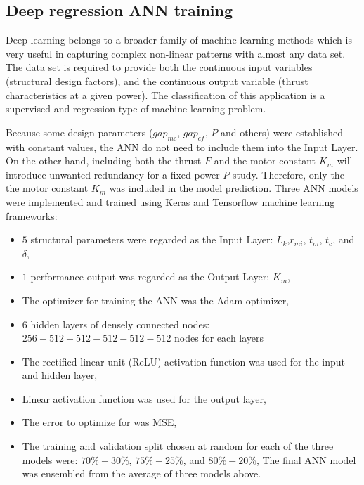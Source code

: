         
        \subsection{Deep regression ANN training}   \label{Chapter:RSM/PMLSM/ANN training}
        
            
            Deep learning belongs to a broader family of machine learning methods which is very useful in capturing complex non-linear patterns with almost any data set. The data set is required to provide both the continuous input variables (structural design factors), and the continuous output variable (thrust characteristics at a given power). The classification of this application is a supervised and regression type of machine learning problem.
            
            
            Because some design parameters ($gap_{mc}$, $gap_{cf}$, $P$ and others) were established with constant values, the \acs{ANN} do not need to include them into the Input Layer. On the other hand, including both the thrust $F$ and the motor constant $K_m$ will introduce unwanted redundancy for a fixed power $P$ study. Therefore, only the the motor constant $K_m$ was included in the model prediction. Three \acs{ANN} models were implemented and trained using Keras and Tensorflow machine learning frameworks:
            
            
            \begin{itemize}
                \item $5$ structural parameters were regarded as the Input Layer: $L_k$,$r_{mi}$, $t_m$, $t_c$, and $\delta$,
                \item $1$ performance output was regarded as the Output Layer: $K_m$,
                \item The optimizer for training the \acs{ANN} was the Adam optimizer,
                \item $6$ hidden layers of densely connected nodes: $256-512-512-512-512-512$ nodes for each layers
                \item The rectified linear unit (ReLU) activation function was used
for the input and hidden layer,
                \item Linear activation function was used for the output layer,
                \item The error to optimize for was \acf{MSE},
                \item The training and validation split chosen at random for each of the three models were: $70\%-30\%$, $75\%-25\%$, and $80\%-20\%$,
                The final \acs{ANN} model was ensembled from the average of three models above.
            \end{itemize}
            

